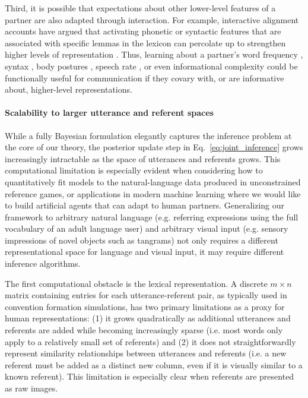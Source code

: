 Third, it is possible that expectations about other lower-level features of a partner are also adapted through interaction.
For example, interactive alignment accounts \cite{pickering2004toward} have argued that activating phonetic or syntactic features that are associated with specific lemmas in the lexicon can percolate up to strengthen higher levels of representation \cite{roelofs1992spreading,pickering1998representation}.
Thus, learning about a partner's word frequency \cite{louwerse2012behavior}, syntax \cite{gruberg2019syntactic,levelt1982surface}, body postures \cite{lakin2003using}, speech rate \cite{giles1991contexts}, or even informational complexity \cite{abney2014complexity} could be functionally useful for communication if they covary with, or are informative about, higher-level representations. 

\paragraph{Scalability to larger utterance and referent spaces}
While a fully Bayesian formulation elegantly captures the inference problem at the core of our theory, the posterior update step in Eq.~\ref{eq:joint_inference} grows increasingly intractable as the space of utterances and referents grows. 
This computational limitation is especially evident when considering how to quantitatively fit models to the natural-language data produced in unconstrained reference games, or applications in modern machine learning where we would like to build artificial agents that can adapt to human partners.
Generalizing our framework to arbitrary natural language (e.g. referring expressions using the full vocabulary of an adult language user) and arbitrary visual input (e.g. sensory impressions of novel objects such as tangrams) not only requires a different representational space for language and visual input, it may require different inference algorithms. 

The first computational obstacle is the lexical representation.
A discrete $m\times n$ matrix containing entries for each utterance-referent pair, as typically used in convention formation simulations, has two primary limitations as a proxy for human representations: (1) it  grows quadratically as additional utterances and referents are added while becoming increasingly sparse (i.e. most words only apply to a relatively small set of referents) and (2) it does not straightforwardly represent similarity relationships between utterances and referents (i.e. a new referent must be added as a distinct new column, even if it is visually similar to a known referent).
This limitation is especially clear when referents are presented as raw images. 

